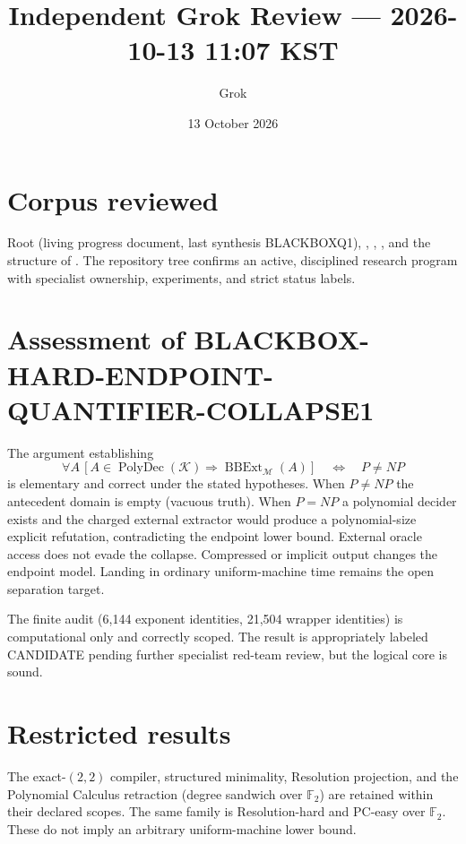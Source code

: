 \documentclass[11pt]{article}
\title{Independent Grok Review --- 2026-10-13 11:07 KST}
\author{Grok}
\date{13 October 2026}
\begin{document}
\maketitle

\begin{center}
\end{center}

\section{Corpus reviewed}
Root  (living progress document, last synthesis BLACKBOXQ1),
, , ,
and the structure of .  The repository tree confirms an active,
disciplined research program with specialist ownership, experiments, and strict
status labels.

\section{Assessment of BLACKBOX-HARD-ENDPOINT-QUANTIFIER-COLLAPSE1}
The argument establishing
\[
\forall A\,[A\in\operatorname{PolyDec}(\mathcal K)\Rightarrow\operatorname{BBExt}_{\mathcal M}(A)]
\quad\Longleftrightarrow\quad P\neq NP
\]
is elementary and correct under the stated hypotheses.  When \(P\neq NP\) the
antecedent domain is empty (vacuous truth).  When \(P=NP\) a polynomial decider
exists and the charged external extractor would produce a polynomial-size explicit
refutation, contradicting the endpoint lower bound.  External oracle access does
not evade the collapse.  Compressed or implicit output changes the endpoint model.
Landing in ordinary uniform-machine time remains the open separation target.

The finite audit (6,144 exponent identities, 21,504 wrapper identities) is
computational only and correctly scoped.  The result is appropriately labeled
CANDIDATE pending further specialist red-team review, but the logical core is
sound.

\section{Restricted results}
The exact-\((2,2)\) compiler, structured minimality, Resolution projection, and
the Polynomial Calculus retraction (degree sandwich over \(\mathbb F_2\)) are
retained within their declared scopes.  The same family is Resolution-hard and
PC-easy over \(\mathbb F_2\).  These do not imply an arbitrary uniform-machine
lower bound.
\end{document}
